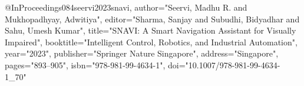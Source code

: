 @InProceedings{084seervi2023snavi,
author="Seervi, Madhu R.
and Mukhopadhyay, Adwitiya",
editor="Sharma, Sanjay
and Subudhi, Bidyadhar
and Sahu, Umesh Kumar",
title="SNAVI: A Smart Navigation Assistant for Visually Impaired",
booktitle="Intelligent Control, Robotics, and Industrial Automation",
year="2023",
publisher="Springer Nature Singapore",
address="Singapore",
pages="893--905",
isbn="978-981-99-4634-1",
doi="10.1007/978-981-99-4634-1_70"
}